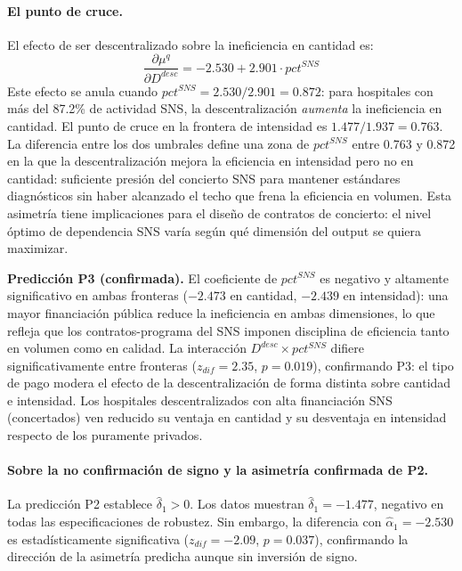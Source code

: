 \documentclass[12pt, a4paper, twoside, openright]{book}
\theoremstyle{plain}
\theoremstyle{definition}
\theoremstyle{remark}
\begin{document}
\paragraph{El punto de cruce.} El efecto de ser descentralizado sobre la ineficiencia en cantidad es:
\begin{equation}
  \frac{\partial \mu^q}{\partial D^{desc}} =
  -2.530 + 2.901 \cdot pct^{SNS}
  \label{eq:ddesc_dq}
\end{equation}
Este efecto se anula cuando $pct^{SNS} = 2.530/2.901 = 0.872$: para hospitales con más del 87.2\% de actividad SNS, la descentralización \textit{aumenta} la ineficiencia en cantidad. El punto de cruce en la frontera de intensidad es $1.477/1.937 = 0.763$. La diferencia entre los dos umbrales define una zona de $pct^{SNS}$ entre 0.763 y 0.872 en la que la descentralización mejora la eficiencia en intensidad pero no en cantidad: suficiente presión del concierto SNS para mantener estándares diagnósticos sin haber alcanzado el techo que frena la eficiencia en volumen. Esta asimetría tiene implicaciones para el diseño de contratos de concierto: el nivel óptimo de dependencia SNS varía según qué dimensión del output se quiera maximizar.

\textbf{Predicción P3 (confirmada).} El coeficiente de $pct^{SNS}$ es negativo y altamente significativo en ambas fronteras ($-2.473$ en cantidad, $-2.439$ en intensidad): una mayor financiación pública reduce la ineficiencia en ambas dimensiones, lo que refleja que los contratos-programa del SNS imponen disciplina de eficiencia tanto en volumen como en calidad. La interacción $D^{desc}\times pct^{SNS}$ difiere significativamente entre fronteras ($z_{dif}=2.35$, $p=0.019$), confirmando P3: el tipo de pago modera el efecto de la descentralización de forma distinta sobre cantidad e intensidad. Los hospitales descentralizados con alta financiación SNS (concertados) ven reducido su ventaja en cantidad y su desventaja en intensidad respecto de los puramente privados.

\paragraph{Sobre la no confirmación de signo y la asimetría confirmada de P2.}
La predicción P2 establece $\hat{\delta}_1 > 0$. Los datos muestran $\hat{\delta}_1 = -1.477$, negativo en todas las especificaciones de robustez. Sin embargo, la diferencia con $\hat{\alpha}_1 = -2.530$ es estadísticamente significativa ($z_{dif}=-2.09$, $p=0.037$), confirmando la dirección de la asimetría predicha aunque sin inversión de signo.
\end{document}
